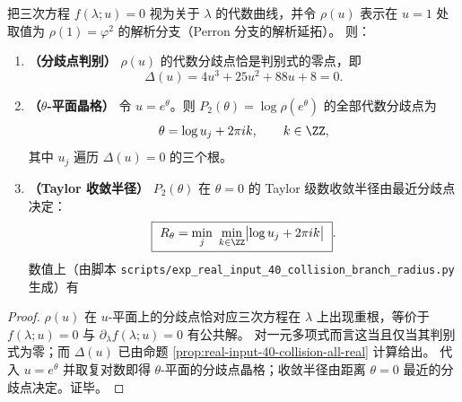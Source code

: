 \begin{corollary}[复分歧点与 \texorpdfstring{$\theta=0$}{theta=0} 的解析半径]\label{cor:real-input-40-collision-branch-radius}
把三次方程 \(f(\lambda;u)=0\) 视为关于 \(\lambda\) 的代数曲线，并令 \(\rho(u)\) 表示在 \(u=1\) 处取值为 \(\rho(1)=\varphi^2\) 的解析分支（Perron 分支的解析延拓）。
则：
\begin{enumerate}
  \item \textbf{（分歧点判别）} \(\rho(u)\) 的代数分歧点恰是判别式的零点，即
  \[
  \Delta(u)=4u^3+25u^2+88u+8=0.
  \]
  \item \textbf{（\(\theta\)-平面晶格）} 令 \(u=e^\theta\)。则 \(P_2(\theta)=\log\rho(e^\theta)\) 的全部代数分歧点为
  \[
  \theta=\log u_j+2\pi i k,\qquad k\in\ZZ,
  \]
  其中 \(u_j\) 遍历 \(\Delta(u)=0\) 的三个根。
  \item \textbf{（Taylor 收敛半径）} \(P_2(\theta)\) 在 \(\theta=0\) 的 Taylor 级数收敛半径由最近分歧点决定：
  \[
  \boxed{\ R_\theta=\min_{j}\ \min_{k\in\ZZ}\bigl|\log u_j+2\pi i k\bigr|\ }.
  \]
  数值上（由脚本 \texttt{scripts/exp\_real\_input\_40\_collision\_branch\_radius.py} 生成）有
  
\end{enumerate}
\end{corollary}
\begin{proof}
\(\rho(u)\) 在 \(u\)-平面上的分歧点恰对应三次方程在 \(\lambda\) 上出现重根，等价于
\(
f(\lambda;u)=0
\)
与
\(
\partial_\lambda f(\lambda;u)=0
\)
有公共解。
对一元多项式而言这当且仅当其判别式为零；而 \(\Delta(u)\) 已由命题 \ref{prop:real-input-40-collision-all-real} 计算给出。
代入 \(u=e^\theta\) 并取复对数即得 \(\theta\)-平面的分歧点晶格；收敛半径由距离 \(\theta=0\) 最近的分歧点决定。证毕。
\end{proof}


